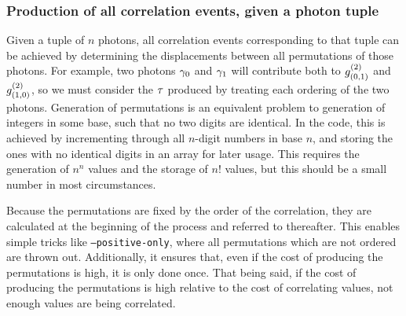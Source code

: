 %
%
%

\subsubsection{Production of all correlation events, given a photon tuple}
Given a tuple of $n$ photons, all correlation events corresponding to that tuple can be achieved by determining the displacements between all permutations of those photons. For example, two photons $\gamma_{0}$ and $\gamma_{1}$ will contribute both to $g^{(2)}_{(0,1)}$ and $g^{(2)}_{(1,0)}$, so we must consider the $\tau$ produced by treating each ordering of the two photons. Generation of permutations is an equivalent problem to generation of integers in some base, such that no two digits are identical. In the code, this is achieved by incrementing through all $n$-digit numbers in base $n$, and storing the ones with no identical digits in an array for later usage. This requires the generation of $n^{n}$ values and the storage of $n!$ values, but this should be a small number in most circumstances. 

Because the permutations are fixed by the order of the correlation, they are calculated at the beginning of the process and referred to thereafter. This enables simple tricks like \texttt{--positive-only}, where all permutations which are not ordered are thrown out. Additionally, it ensures that, even if the cost of producing the permutations is high, it is only done once. That being said, if the cost of producing the permutations is high relative to the cost of correlating values, not enough values are being correlated.

